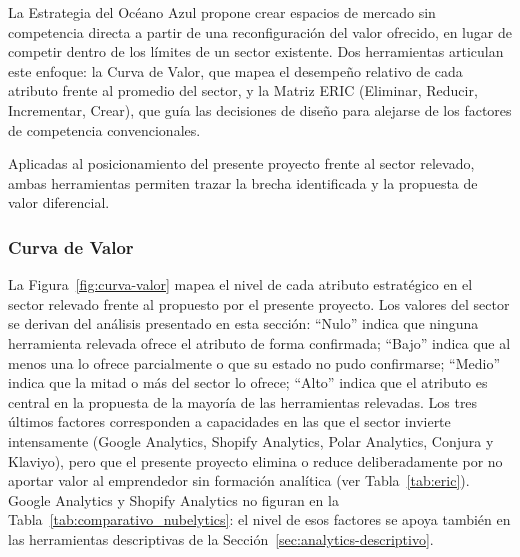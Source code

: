 La Estrategia del Océano Azul \parencite{KimMauborgne2005} propone crear espacios de mercado sin competencia directa a partir de una reconfiguración del valor ofrecido, en lugar de competir dentro de los límites de un sector existente. Dos herramientas articulan este enfoque: la Curva de Valor, que mapea el desempeño relativo de cada atributo frente al promedio del sector, y la Matriz ERIC (Eliminar, Reducir, Incrementar, Crear), que guía las decisiones de diseño para alejarse de los factores de competencia convencionales.

Aplicadas al posicionamiento del presente proyecto frente al sector relevado, ambas herramientas permiten trazar la brecha identificada y la propuesta de valor diferencial.

\subsubsection{Curva de Valor}
\label{sec:curva-valor}

La Figura~\ref{fig:curva-valor} mapea el nivel de cada atributo estratégico en el sector relevado frente al propuesto por el presente proyecto. Los valores del sector se derivan del análisis presentado en esta sección: ``Nulo'' indica que ninguna herramienta relevada ofrece el atributo de forma confirmada; ``Bajo'' indica que al menos una lo ofrece parcialmente o que su estado no pudo confirmarse; ``Medio'' indica que la mitad o más del sector lo ofrece; ``Alto'' indica que el atributo es central en la propuesta de la mayoría de las herramientas relevadas. Los tres últimos factores corresponden a capacidades en las que el sector invierte intensamente (Google Analytics, Shopify Analytics, Polar Analytics, Conjura y Klaviyo), pero que el presente proyecto elimina o reduce deliberadamente por no aportar valor al emprendedor sin formación analítica (ver Tabla~\ref{tab:eric}). Google Analytics y Shopify Analytics no figuran en la Tabla~\ref{tab:comparativo_nubelytics}: el nivel de esos factores se apoya también en las herramientas descriptivas de la Sección~\ref{sec:analytics-descriptivo}.

